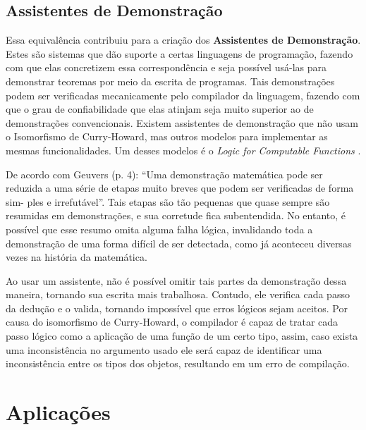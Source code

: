 \documentclass[12pt, oneside, a4paper,english,brazil]{abntex2}
\begin{document}
\subsection*{Assistentes de Demonstra\c{c}\~ao}
\qquad Essa equivalência contribuiu para a cria\c{c}\~ao dos \textbf{Assistentes de Demonstra\c{c}\~ao}. Estes
são sistemas que dão suporte a certas linguagens de programação, fazendo com que elas
concretizem essa correspondência e seja possível usá-las para demonstrar teoremas por
meio da escrita de programas. Tais demonstrações podem ser verificadas mecanicamente
pelo compilador da linguagem, fazendo com que o grau de confiabilidade que elas atinjam
seja muito superior ao de demonstrações convencionais. Existem assistentes de
demonstra\c{c}\~ao que
n\~ao usam o Isomorfismo de Curry-Howard, mas outros modelos para implementar
as mesmas funcionalidades. Um desses modelos \'e o \textit{Logic for Computable
Functions} \cite{lcf}.

\qquad De acordo com Geuvers \cite{geuvers} (p. 4): ``Uma demonstração matemática pode ser
reduzida a uma série de etapas muito breves que podem ser verificadas de forma sim-
ples e irrefutável''. Tais etapas são tão pequenas que quase sempre são resumidas em
demonstrações, e sua corretude fica subentendida. No entanto, é possível que esse resumo
omita alguma falha lógica, invalidando toda a demonstração de uma forma difícil de ser
detectada, como j\'a aconteceu diversas vezes na hist\'oria da matem\'atica.

\qquad Ao usar um assistente, não é possível omitir tais partes da demonstração dessa
maneira, tornando sua escrita mais trabalhosa. Contudo, ele verifica cada passo da dedução
e o valida, tornando impossível que erros lógicos sejam aceitos. Por causa do isomorfismo
de Curry-Howard, o compilador é capaz de tratar cada passo lógico como a aplicação de
uma função de um certo tipo, assim, caso exista uma inconsistência no argumento usado
ele será capaz de identificar uma inconsistência entre os tipos dos objetos, resultando em
um erro de compilação.

\section{Aplica\c{c}\~oes}
\end{document}
